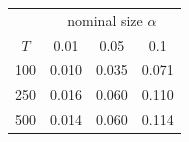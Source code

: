 % 
\begin{tabular}{cccc}
  \hline
  & \multicolumn{3}{c}{nominal size $\alpha$} \\
 $T$ & 0.01 & 0.05 & 0.1 \\
 \hline
100 & 0.010 & 0.035 & 0.071 \\ 
  250 & 0.016 & 0.060 & 0.110 \\ 
  500 & 0.014 & 0.060 & 0.114 \\ 
   \hline
\end{tabular}
